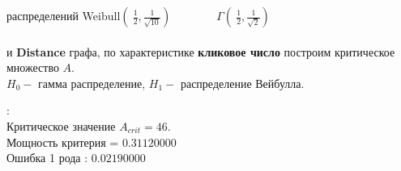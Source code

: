  распределений \qquad\qquad Weibull$(\ \frac{1}{2}, \frac{1}{\sqrt{10}}) \qquad\qquad \Gamma(\ \frac{1}{2}, \frac{1}{\sqrt2}) $\\\\
и \textbf{Distance} графа, по характеристике \textbf{кликовое число} построим критическое множество $A$.\\

\noindent$H_0 - $ гамма распределение, $H_1 - $ распределение Вейбулла.

:\\
Критическое значение $A_{crit} = 46$.\\
Мощность критерия = $0.31120000$\\
Ошибка 1 рода : $0.02190000$\\